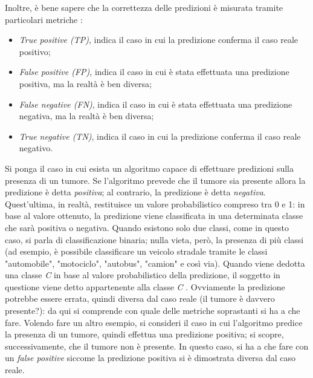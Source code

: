 Inoltre, è bene sapere che la correttezza delle predizioni è misurata tramite particolari metriche \cite{verma2018fairness}:
\begin{itemize}
  \item \emph{True positive (TP)}, indica il caso in cui la predizione conferma il caso reale positivo;
  \item \emph{False positive (FP)}, indica il caso in cui è stata effettuata una predizione positiva, ma la realtà è ben diversa;
  \item \emph{False negative (FN)}, indica il caso in cui è stata effettuata una predizione negativa, ma la realtà è ben diversa;
  \item \emph{True negative (TN)}, indica il caso in cui la predizione conferma il caso reale negativo.
\end{itemize}
Si ponga il caso in cui esista un algoritmo capace di effettuare predizioni sulla presenza di un tumore. Se l'algoritmo prevede che il tumore sia presente allora la predizione è detta \emph{positiva}; al contrario, la predizione è detta \emph{negativa}. Quest'ultima, in realtà, restituisce un valore probabilistico compreso tra 0 e 1: in base al valore ottenuto, la predizione viene classificata in una determinata classe che sarà positiva o negativa. Quando esistono solo due classi, come in questo caso, si parla di classificazione binaria; nulla vieta, però, la presenza di più classi (ad esempio, è possibile classificare un veicolo stradale tramite le classi "automobile", "motociclo", "autobus", "camion" e così via). Quando viene dedotta una classe \emph{C} in base al valore probabilistico della predizione, il soggetto in questione viene detto appartenente alla classe \emph{C} \cite{alpaydin2020introduction}. Ovviamente la predizione potrebbe essere errata, quindi diversa dal caso reale (il tumore è davvero presente?): da qui si comprende con quale delle metriche soprastanti si ha a che fare. Volendo fare un altro esempio, si consideri il caso in cui l'algoritmo predice la presenza di un tumore, quindi effettua una predizione positiva; si scopre, successivamente, che il tumore non è presente. In questo caso, si ha a che fare con un \emph{false positive} siccome la predizione positiva si è dimostrata diversa dal caso reale.

